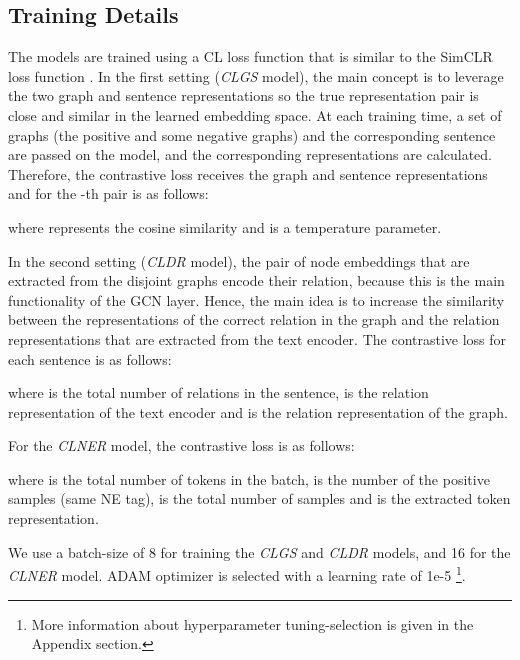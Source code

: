 \documentclass[11pt]{article}
\begin{document}
\subsection{Training Details}

The models are trained using a CL loss function that is similar to the SimCLR loss function \cite{chen2020simple}. In the first setting (\textit{CLGS} model), the main concept is to leverage the two graph and sentence representations so the true representation pair is close and similar in the learned embedding space. At each training time, a set of  graphs (the positive and some negative graphs) and the corresponding sentence are passed on the model, and the corresponding representations are calculated. Therefore, the contrastive loss receives the graph and sentence representations and for the -th pair is as follows:
\vspace{-1mm}

where  represents the cosine similarity and  is a temperature parameter. 

In the second setting (\textit{CLDR} model), the pair of node embeddings that are extracted from the disjoint graphs encode their relation, because this is the main functionality of the GCN layer.  Hence, the main idea is to increase the similarity between the representations of the correct relation in the graph and the relation representations that are extracted from the text encoder.
The contrastive loss for each sentence is as follows:
\vspace{-1mm}

where  is the total number of relations in the sentence,  is the relation representation of the text encoder and  is the relation representation of the graph. 

\newpage
For the \textit{CLNER} model, the contrastive loss is as follows:
\vspace{-1mm}

where  is the total number of tokens in the batch,  is the number of the positive samples (same NE tag),  is the total number of samples and  is the extracted token representation. 

We use a batch-size of 8 for training the \textit{CLGS} and \textit{CLDR} models, and 16 for the \textit{CLNER} model. ADAM optimizer \cite{kingma2014adam} is selected with a learning rate of 1e-5 \footnote{More information about hyperparameter tuning-selection is given in the Appendix section.}.

\vspace{-1mm}
\end{document}

